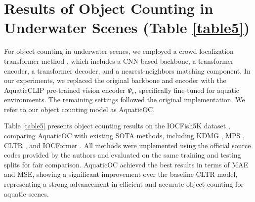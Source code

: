 \begin{table}[t!]
\caption{Comparison of semantic segmentation results on the SUIM \cite{islam2020suim} dataset between AquaticSeg and other SOTA methods. 
AquaticSeg achieves the highest mIoU (0.881) and F-score (0.921), demonstrating superior performance in underwater semantic segmentation tasks.}
\begin{center}
\end{center}
\label{table_ss}
\end{table}


\section{Results of Object Counting in Underwater Scenes (Table \ref{table5})}
\label{counting}
For object counting in underwater scenes, we employed a crowd localization transformer method \cite{cltr_liang2022end}, which includes a CNN-based backbone, a transformer encoder, a transformer decoder, and a nearest-neighbors matching component. 
In our experiments, we replaced the original backbone and encoder with the AquaticCLIP pre-trained vision encoder $\Psi_{v}$, specifically fine-tuned for aquatic environments.
The remaining settings followed the original implementation.
We refer to our object counting model as AquaticOC.

Table \ref{table5} presents object counting results on the IOCFish5K dataset \cite{sun2023indiscernible}, comparing AquaticOC with existing SOTA methods, including KDMG \cite{kdmg}, MPS \cite{mps}, CLTR \cite{cltr_liang2022end}, and IOCFormer \cite{sun2023indiscernible}.
All methods were implemented using the official source codes provided by the authors and evaluated on the same training and testing splits for fair comparison. 
AquaticOC achieved the best results in terms of MAE and MSE, showing a significant improvement over the baseline CLTR model, representing a strong advancement in efficient and accurate object counting for aquatic scenes.






